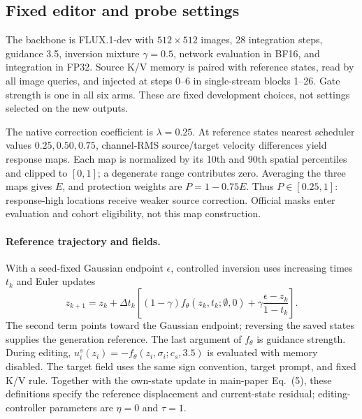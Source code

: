 \documentclass[10pt,doubleanonymous]{ieeeconf}
\begin{document}
\subsection{Fixed editor and probe settings}
The backbone is FLUX.1-dev with $512\times512$ images, 28 integration steps, guidance 3.5, inversion mixture $\gamma=0.5$, network evaluation in BF16, and integration in FP32. Source K/V memory is paired with reference states, read by all image queries, and injected at steps 0--6 in single-stream blocks 1--26. Gate strength is one in all six arms. These are fixed development choices, not settings selected on the new outputs.

The native correction coefficient is $\lambda=0.25$. At reference states nearest scheduler values $0.25,0.50,0.75$, channel-RMS source/target velocity differences yield response maps. Each map is normalized by its 10th and 90th spatial percentiles and clipped to $[0,1]$; a degenerate range contributes zero. Averaging the three maps gives $E$, and protection weights are $P=1-0.75E$. Thus $P\in[0.25,1]$: response-high locations receive weaker source correction. Official masks enter evaluation and cohort eligibility, not this map construction.

\paragraph{Reference trajectory and fields.}
With a seed-fixed Gaussian endpoint $\epsilon$, controlled inversion uses increasing times $t_k$ and Euler updates
\begin{equation}
z_{k+1}=z_k+\Delta t_k\left[(1-\gamma)f_\theta(z_k,t_k;\emptyset,0)
+\gamma\frac{\epsilon-z_k}{1-t_k}\right].
\end{equation}
The second term points toward the Gaussian endpoint; reversing the saved states supplies the generation reference. The last argument of $f_\theta$ is guidance strength. During editing, $u_i^s(z_i)=-f_\theta(z_i,\sigma_i;c_s,3.5)$ is evaluated with memory disabled. The target field uses the same sign convention, target prompt, and fixed K/V rule. Together with the own-state update in main-paper Eq.~(5), these definitions specify the reference displacement and current-state residual; editing-controller parameters are $\eta=0$ and $\tau=1$.
\end{document}
